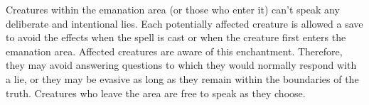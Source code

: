 \spellrng{\rngmed}
\spelldur{\durmed}
\begin{spelleffect}
  Creatures within the emanation area (or those who enter it) can't speak any deliberate and intentional lies. Each potentially affected creature is allowed a save to avoid the effects when the spell is cast or when the creature first enters the emanation area. Affected creatures are aware of this enchantment. Therefore, they may avoid answering questions to which they would normally respond with a lie, or they may be evasive as long as they remain within the boundaries of the truth. Creatures who leave the area are free to speak as they choose.
\end{spelleffect}
